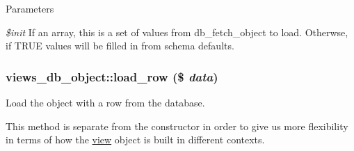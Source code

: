 \begin{DoxyParams}{Parameters}
\item[{\em \$init}]If an array, this is a set of values from db\_\-fetch\_\-object to load. Otherwse, if TRUE values will be filled in from schema defaults. \end{DoxyParams}
\hypertarget{classviews__db__object_a4c8b658c58eb3ae319616f73a2106324}{
\subsubsection[{load\_\-row}]{\setlength{\rightskip}{0pt plus 5cm}views\_\-db\_\-object::load\_\-row (\$ {\em data})}}
\label{classviews__db__object_a4c8b658c58eb3ae319616f73a2106324}
Load the object with a row from the database.

This method is separate from the constructor in order to give us more flexibility in terms of how the \hyperlink{classview}{view} object is built in different contexts.


